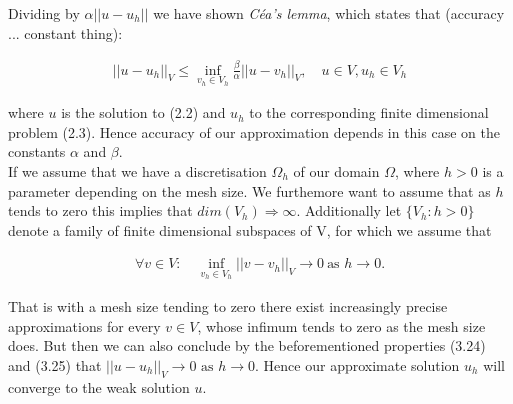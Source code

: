 \documentclass[../draft_1.tex]{subfiles}
\begin{document}
Dividing by $\alpha || u - u_h || $ we have shown \textit{C\'{e}a's lemma}, which states that (accuracy ... constant thing):
\begin{ceqn}
\begin{equation}
\begin{aligned}
|| u - u_h ||_V \leq \inf_{v_h \in V_h} \frac{\beta}{\alpha} || u - v_h ||_V, \quad u \in V, u_h \in V_h
\end{aligned}
\end{equation}
\end{ceqn}
where $u$ is the solution to (2.2) and $u_h$ to the corresponding finite dimensional problem (2.3). Hence accuracy of our approximation depends in this case on the constants $\alpha$ and $\beta$. 
\bigskip
\\ 
If we assume that we have a discretisation $\Omega_h$ of our domain $\Omega$, where $h > 0$ is a parameter depending on the mesh size.  We furthemore want to assume that as $h$ tends to zero this implies that $dim(V_h) \Rightarrow \infty$. Additionally let $\{V_h : h > 0\}$ denote a family of finite dimensional subspaces of V, for which we assume that
\begin{ceqn}
\begin{equation}
\begin{aligned}
\forall v \in V : \quad \inf_{v_h \in V_h} || v - v_h||_V \rightarrow 0 \ \text{as } h \rightarrow 0.
\end{aligned}
\end{equation}
\end{ceqn}
That is with a mesh size tending to zero there exist increasingly precise approximations for every $v \in V$, whose infimum tends to zero as the mesh size does. But then we can also conclude by  the beforementioned properties (3.24) and (3.25) that $|| u - u_h||_V \rightarrow 0 \text{ as } h \rightarrow 0$. Hence our approximate solution $u_h$ will converge to the weak solution $u$. 
\end{document}
